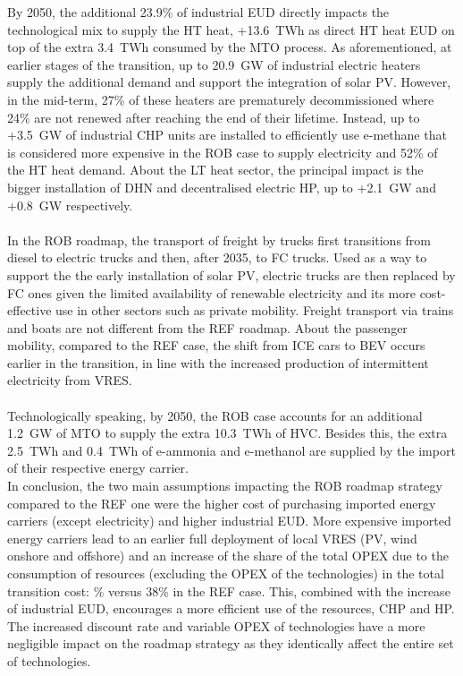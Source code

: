 By 2050, the additional 23.9\% of industrial \gls{EUD} directly impacts the technological mix to supply the \gls{HT} heat, \ie +13.6~TWh as direct \gls{HT} heat \gls{EUD} on top of the extra 3.4~TWh consumed by the \gls{MTO} process. As aforementioned, at earlier stages of the transition, up to 20.9~GW of industrial electric heaters supply the additional demand and support the integration of solar \gls{PV}.  However, in the mid-term, 27\% of these heaters are prematurely decommissioned where 24\% are not renewed after reaching the end of their lifetime. Instead, up to +3.5~GW of industrial \gls{CHP} units are installed to efficiently use e-methane that is considered more expensive in the ROB case to supply electricity and 52\% of the \gls{HT} heat demand. About the \gls{LT} heat sector, the principal impact is the bigger installation of \gls{DHN} and decentralised electric \gls{HP}, up to +2.1~GW and +0.8~GW respectively. \\

\\

In the ROB roadmap, the transport of freight by trucks first transitions from diesel to electric trucks and then, after 2035, to \gls{FC} trucks. Used as a way to support the the early installation of solar \gls{PV}, electric trucks are then replaced by \gls{FC} ones given the limited availability of renewable electricity and its more cost-effective use in other sectors such as private mobility. Freight transport via trains and boats are not different from the REF roadmap. About the passenger mobility, compared to the REF case, the shift from \gls{ICE} cars to \gls{BEV} occurs earlier in the transition, in line with the increased production of intermittent electricity from \gls{VRES}. \\

\\

Technologically speaking, by 2050, the ROB case accounts for an additional 1.2~GW of \gls{MTO} to supply the extra 10.3~TWh of \gls{HVC}. Besides this, the extra 2.5~TWh and 0.4~TWh of e-ammonia and e-methanol are supplied by the import of their respective energy carrier.\\

In conclusion, the two main assumptions impacting the ROB roadmap strategy compared to the REF one were the higher cost of purchasing imported energy carriers (except electricity) and higher industrial \gls{EUD}. More expensive imported energy carriers lead to an earlier full deployment of local \gls{VRES} (\ie \gls{PV}, wind onshore and offshore) and an increase of the share of the total OPEX due to the consumption of resources (\ie excluding the OPEX of the technologies) in the total transition cost: \% versus 38\% in the REF case. This, combined with the increase of industrial \gls{EUD}, encourages a more efficient use of the resources, \ie \gls{CHP} and \gls{HP}. The increased discount rate and variable OPEX of technologies have a more negligible impact on the roadmap strategy as they identically affect the entire set of technologies.

